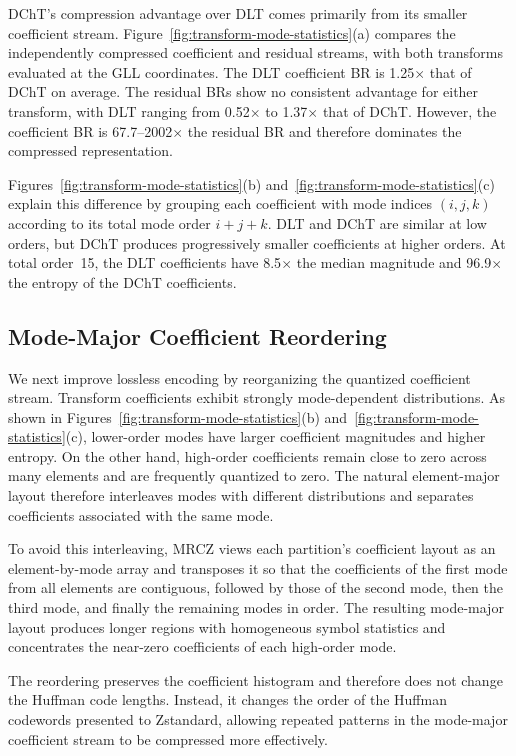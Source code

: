 DChT's compression advantage over DLT comes primarily from its smaller coefficient stream. Figure~\ref{fig:transform-mode-statistics}(a) compares the independently compressed coefficient and residual streams, with both transforms evaluated at the GLL coordinates. The DLT coefficient BR is 1.25$\times$ that of DChT on average. The residual BRs show no consistent advantage for either transform, with DLT ranging from 0.52$\times$ to 1.37$\times$ that of DChT. However, the coefficient BR is 67.7--2002$\times$ the residual BR and therefore dominates the compressed representation.

Figures~\ref{fig:transform-mode-statistics}(b) and~\ref{fig:transform-mode-statistics}(c) explain this difference by grouping each coefficient with mode indices $(i,j,k)$ according to its total mode order $i+j+k$. DLT and DChT are similar at low orders, but DChT produces progressively smaller coefficients at higher orders. At total order~15, the DLT coefficients have 8.5$\times$ the median magnitude and 96.9$\times$ the entropy of the DChT coefficients.

\subsection{Mode-Major Coefficient Reordering}\label{sec:mrcz:transpose}

We next improve lossless encoding by reorganizing the quantized coefficient stream. Transform coefficients exhibit strongly mode-dependent distributions. As shown in Figures~\ref{fig:transform-mode-statistics}(b) and~\ref{fig:transform-mode-statistics}(c), lower-order modes have larger coefficient magnitudes and higher entropy. On the other hand, high-order coefficients remain close to zero across many elements and are frequently quantized to zero. The natural element-major layout therefore interleaves modes with different distributions and separates coefficients associated with the same mode.

To avoid this interleaving, MRCZ views each partition's coefficient layout as an element-by-mode array and transposes it so that the coefficients of the first mode from all elements are contiguous, followed by those of the second mode, then the third mode, and finally the remaining modes in order. The resulting mode-major layout produces longer regions with homogeneous symbol statistics and concentrates the near-zero coefficients of each high-order mode.

The reordering preserves the coefficient histogram and therefore does not change the Huffman code lengths. Instead, it changes the order of the Huffman codewords presented to Zstandard, allowing repeated patterns in the mode-major coefficient stream to be compressed more effectively.

